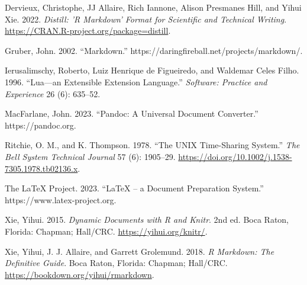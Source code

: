 \hypertarget{refs}{}
\begin{CSLReferences}{1}{0}
\leavevmode{}%
Dervieux, Christophe, JJ Allaire, Rich Iannone, Alison Presmanes Hill, and Yihui Xie. 2022. \emph{Distill: 'R Markdown' Format for Scientific and Technical Writing}. \url{https://CRAN.R-project.org/package=distill}.

\leavevmode{}%
Gruber, John. 2002. {``Markdown.''} https://daringfireball.net/projects/markdown/.

\leavevmode{}%
Ierusalimschy, Roberto, Luiz Henrique de Figueiredo, and Waldemar Celes Filho. 1996. {``Lua---an Extensible Extension Language.''} \emph{Software: Practice and Experience} 26 (6): 635--52.

\leavevmode{}%
MacFarlane, John. 2023. {``Pandoc: A Universal Document Converter.''} https://pandoc.org.

\leavevmode{}%
Ritchie, O. M., and K. Thompson. 1978. {``The UNIX Time-Sharing System.''} \emph{The Bell System Technical Journal} 57 (6): 1905--29. \url{https://doi.org/10.1002/j.1538-7305.1978.tb02136.x}.

\leavevmode{}%
The LaTeX Project. 2023. {``LaTeX -- a Document Preparation System.''} https://www.latex-project.org.

\leavevmode{}%
Xie, Yihui. 2015. \emph{Dynamic Documents with {R} and Knitr}. 2nd ed. Boca Raton, Florida: Chapman; Hall/CRC. \url{https://yihui.org/knitr/}.

\leavevmode{}%
Xie, Yihui, J. J. Allaire, and Garrett Grolemund. 2018. \emph{R Markdown: The Definitive Guide}. Boca Raton, Florida: Chapman; Hall/CRC. \url{https://bookdown.org/yihui/rmarkdown}.

\end{CSLReferences}



\address{%
Abhishek Ulayil\\
Student, Institute of Actuaries of India\\%
Mumbai, India\\
%
%
\textit{ORCiD: \href{https://orcid.org/0009-0000-6935-8690}{0009-0000-6935-8690}}\\%
\href{mailto:perricoq@outlook.com}{\nolinkurl{perricoq@outlook.com}}%
}

